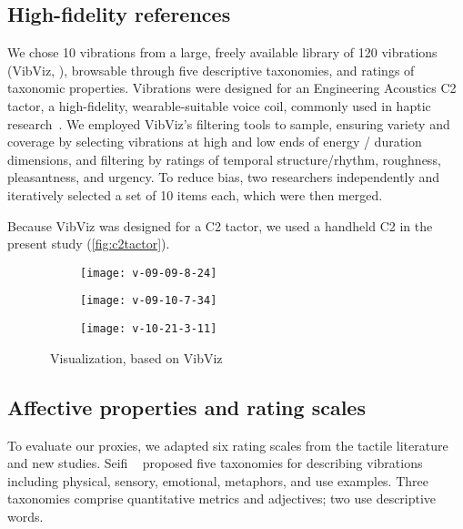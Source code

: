 \subsection{High-fidelity references}
We chose 10 vibrations from a large, freely available library of 120 vibrations (VibViz, \cite{Seifi2015}), browsable through five descriptive taxonomies, and ratings of taxonomic properties. Vibrations were designed for an Engineering Acoustics C2 tactor, a high-fidelity, wearable-suitable voice coil, commonly used in haptic research~\cite{Seifi2015}.
We employed VibViz's filtering tools to sample, ensuring variety and coverage by selecting vibrations at  high and low ends of energy / duration dimensions, and filtering by ratings of temporal structure/rhythm, roughness, pleasantness, and urgency.
To reduce bias, two researchers independently and iteratively selected a set of 10 items each, which were then merged.

Because VibViz was designed for a C2 tactor, we used a handheld C2 in the present study (\autoref{fig:c2tactor}).

       \begin{figure}
        \centering
        \begin{subfigure}{0.15\textwidth}
            \centering
            \texttt{[image: v-09-09-8-24]}
        \end{subfigure}
        \begin{subfigure}{0.15\textwidth}
            \centering
            \texttt{[image: v-09-10-7-34]}
        \end{subfigure}
        \begin{subfigure}{0.15\textwidth}
            \centering
            \texttt{[image: v-10-21-3-11]}
        \end{subfigure}
        \caption{\original~Visualization, based on VibViz}
        \label{fig:vis:original}
    \end{figure}

\subsection{Affective properties and rating scales} 
To evaluate our proxies, we adapted six rating scales from the tactile literature and new studies.
%
Seifi \etal~\cite{Seifi2015} proposed five taxonomies for describing vibrations including  physical, sensory, emotional, metaphors, and use examples.
Three taxonomies comprise quantitative metrics and adjectives; two use descriptive words. 

